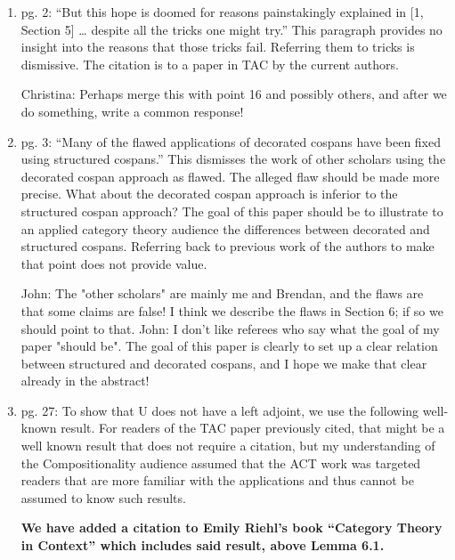 \documentclass[reqno]{amsart}
\def\chris{\color{purple} Christina: }
\def\john{\color{red} John: }
\begin{document}
\begin{enumerate}

\item pg. 2: “But this hope is doomed for reasons painstakingly explained in [1, Section 5] … despite all the tricks one might try.” This paragraph 
provides 
no insight into the reasons that those tricks fail. Referring them to tricks is dismissive. The citation is to a paper in TAC by the current authors.

{\chris Perhaps merge this with point 16 and possibly others, and after we do something, write a common response!}

\item pg. 3: “Many of the flawed applications of decorated cospans have been fixed using structured cospans.” This dismisses the work of other 
scholars 
using the decorated cospan approach as flawed. The alleged flaw should be made more precise. What about the decorated cospan approach is inferior to 
the structured cospan approach? The goal of this paper should be to illustrate to an applied category theory audience the differences between 
decorated and structured cospans. Referring back to previous work of the authors to make that point does not provide value.

{\john The "other scholars" are mainly me and Brendan, and the flaws are that some claims are false! I think we describe the flaws in Section 6; if so 
we should point to that.}
{\john I don't like referees who say what the goal of my paper "should be". The goal of this paper is clearly to set up a clear relation between 
structured and decorated cospans, and I hope we make that clear already in the abstract!}

\item pg. 27: To show that U does not have a left adjoint, we use the following well-known result. For readers of the TAC paper previously cited, 
that might 
be a well known result that does not require a citation, but my understanding of the Compositionality audience assumed that the ACT work was targeted 
readers that are more familiar with the applications and thus cannot be assumed to know such results.

{\bf We have added a citation to Emily Riehl's book ``Category Theory in Context'' which includes said result, above Lemma 6.1.}


\end{enumerate}
\end{document}
